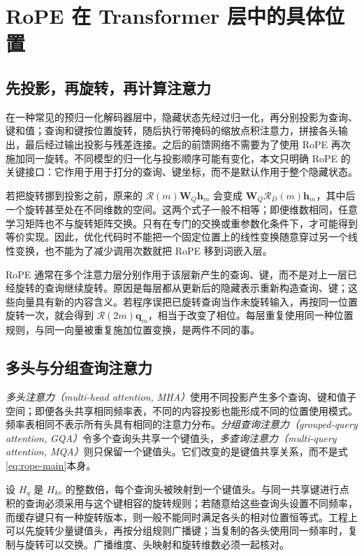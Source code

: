 \documentclass[UTF8,12pt,a4paper,fontset=fandol]{ctexart}
\begin{document}
\section{RoPE 在 Transformer 层中的具体位置}
\label{sec:rope-architecture}

\subsection{先投影，再旋转，再计算注意力}
在一种常见的预归一化解码器层中，隐藏状态先经过归一化，再分别投影为查询、键和值；查询和键按位置旋转，随后执行带掩码的缩放点积注意力，拼接各头输出，最后经过输出投影与残差连接。之后的前馈网络不需要为了使用 RoPE 再次施加同一旋转。不同模型的归一化与投影顺序可能有变化，本文只明确 RoPE 的关键接口：它作用于用于打分的查询、键坐标，而不是默认作用于整个隐藏状态。

若把旋转挪到投影之前，原来的 $\mathcal R(m)\mathbf W_Q\mathbf h_m$ 会变成 $\mathbf W_Q\mathcal R_D(m)\mathbf h_m$，其中后一个旋转甚至处在不同维数的空间。这两个式子一般不相等；即便维数相同，任意学习矩阵也不与旋转矩阵交换。只有在专门的交换或重参数化条件下，才可能得到等价实现。因此，优化代码时不能把一个固定位置上的线性变换随意穿过另一个线性变换，也不能为了减少调用次数就把 RoPE 移到词嵌入层。

RoPE 通常在多个注意力层分别作用于该层新产生的查询、键，而不是对上一层已经旋转的查询继续旋转。原因是每层都从更新后的隐藏表示重新构造查询、键；这些向量具有新的内容含义。若程序误把已旋转查询当作未旋转输入，再按同一位置旋转一次，就会得到 $\mathcal R(2m)\mathbf q_m$，相当于改变了相位。每层重复使用同一种位置规则，与同一向量被重复施加位置变换，是两件不同的事。

\subsection{多头与分组查询注意力}
\emph{多头注意力（multi-head attention, MHA）}使用不同投影产生多个查询、键和值子空间；即便各头共享相同频率表，不同的内容投影也能形成不同的位置使用模式。频率表相同不表示所有头具有相同的注意力分布。\emph{分组查询注意力（grouped-query attention, GQA）}令多个查询头共享一个键值头，\emph{多查询注意力（multi-query attention, MQA）}则只保留一个键值头。它们改变的是键值共享关系，而不是式\eqref{eq:rope-main}本身。

设 $H_q$ 是 $H_{kv}$ 的整数倍，每个查询头被映射到一个键值头。与同一共享键进行点积的查询必须采用与这个键相容的旋转规则；若随意给这些查询头设置不同频率，而缓存键只有一种旋转版本，则一般不能同时满足各头的相对位置恒等式。工程上可以先旋转少量键值头，再按分组规则广播键；当复制的各头使用同一频率时，复制与旋转可以交换。广播维度、头映射和旋转维数必须一起核对。
\end{document}
